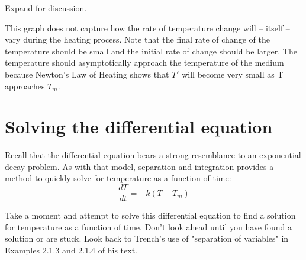 \documentclass{ximera}
\begin{document}
\begin{problem}
\begin{center} 
\end{center}
 
Expand for discussion.
 
 \begin{expandable}
    This graph does not capture how the rate of temperature change will – itself – vary during the heating process.  Note that the final rate of change of the temperature should be small and the initial rate of change should be larger.  The temperature should asymptotically approach the temperature of the medium because Newton's Law of Heating shows that $T'$ will become very small as T approaches $T_m$.
  \end{expandable}
  
\end{problem}
 
\section*{Solving the differential equation}
 
Recall that the differential equation bears a strong resemblance to an exponential decay problem.  As with that model, separation and integration provides a method to quickly solve for temperature as a function of time:
\[
\frac{dT}{dt}=-k(T-T_m)
\]
 
Take a moment and attempt to solve this differential equation to find a solution for temperature as a function of time.  Don't look ahead until you have found a solution or are stuck.  Look back to Trench's use of "separation of variables" in Examples 2.1.3 and 2.1.4 of his text.
    
\end{document}
